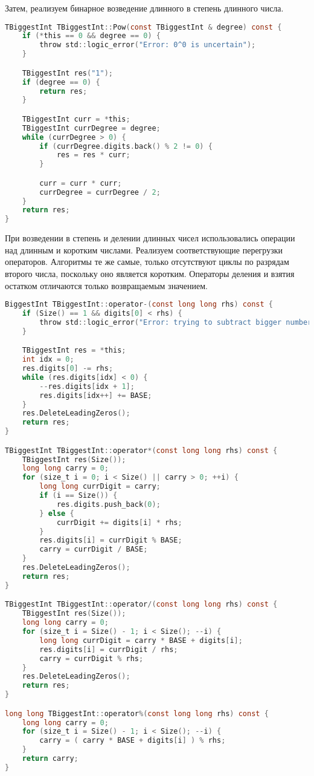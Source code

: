 Затем, реализуем бинарное возведение длинного в степень длинного числа.

\begin{lstlisting}[language=C]
TBiggestInt TBiggestInt::Pow(const TBiggestInt & degree) const {
    if (*this == 0 && degree == 0) {
        throw std::logic_error("Error: 0^0 is uncertain");
    }

    TBiggestInt res("1");
    if (degree == 0) {
        return res;
    }

    TBiggestInt curr = *this;
    TBiggestInt currDegree = degree;
    while (currDegree > 0) {
        if (currDegree.digits.back() % 2 != 0) {
            res = res * curr;
        }

        curr = curr * curr;
        currDegree = currDegree / 2;
    }
    return res;
}
\end{lstlisting}

При возведении в степень и делении длинных чисел использовались операции над длинным и коротким числами. Реализуем соответствующие перегрузки операторов. Алгоритмы те же самые, только отсутствуют циклы по разрядам второго числа, поскольку оно является коротким. Операторы деления и взятия остатком отличаются только возвращаемым значением.

\begin{lstlisting}[language=C]
BiggestInt TBiggestInt::operator-(const long long rhs) const {
    if (Size() == 1 && digits[0] < rhs) {
        throw std::logic_error("Error: trying to subtract bigger number from smaller");
    }

    TBiggestInt res = *this;
    int idx = 0;
    res.digits[0] -= rhs;
    while (res.digits[idx] < 0) {
        --res.digits[idx + 1];
        res.digits[idx++] += BASE;
    }
    res.DeleteLeadingZeros();
    return res;
}

TBiggestInt TBiggestInt::operator*(const long long rhs) const {
    TBiggestInt res(Size());
    long long carry = 0;
    for (size_t i = 0; i < Size() || carry > 0; ++i) {
        long long currDigit = carry;
        if (i == Size()) {
            res.digits.push_back(0);
        } else {
            currDigit += digits[i] * rhs;
        }
        res.digits[i] = currDigit % BASE;
        carry = currDigit / BASE;
    }
    res.DeleteLeadingZeros();
    return res;
}

TBiggestInt TBiggestInt::operator/(const long long rhs) const {
    TBiggestInt res(Size());
    long long carry = 0;
    for (size_t i = Size() - 1; i < Size(); --i) {
        long long currDigit = carry * BASE + digits[i];
        res.digits[i] = currDigit / rhs;
        carry = currDigit % rhs;
    }
    res.DeleteLeadingZeros();
    return res;
}

long long TBiggestInt::operator%(const long long rhs) const {
    long long carry = 0;
    for (size_t i = Size() - 1; i < Size(); --i) {
        carry = ( carry * BASE + digits[i] ) % rhs;
    }
    return carry;
}
\end{lstlisting}


